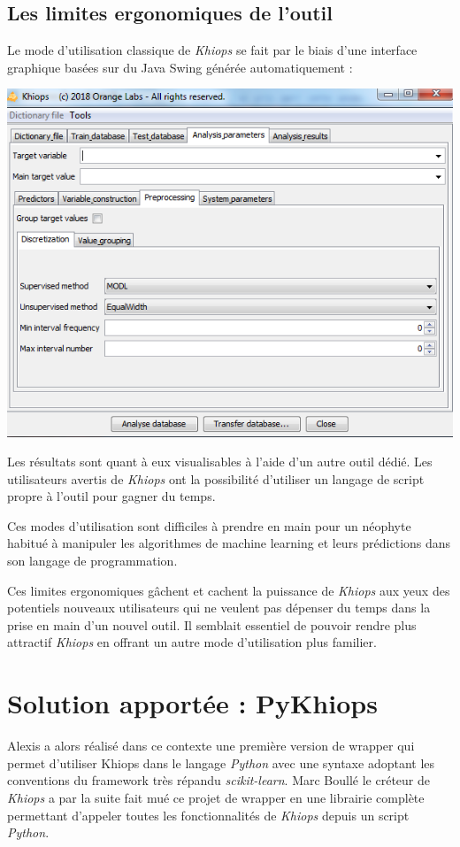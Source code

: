 \documentclass[12pt]{report}
\begin{document}
	\subsection{Les limites ergonomiques de l'outil}
	Le mode d'utilisation classique de \textit{Khiops} se fait par le biais d'une interface graphique basées sur du Java Swing générée automatiquement :
	\begin{center}
		\includegraphics[scale=0.8]{screen_ihm_khiops.png}\newline
	\end{center}
	Les résultats sont quant à eux visualisables à l'aide d'un autre outil dédié.
	Les utilisateurs avertis de \textit{Khiops} ont la possibilité d'utiliser un langage de script propre à l'outil pour gagner du temps.
	
	Ces modes d'utilisation sont difficiles à prendre en main pour un néophyte habitué à manipuler les algorithmes de machine learning et leurs prédictions dans son langage de programmation.
	
	Ces limites ergonomiques gâchent et cachent la puissance de \textit{Khiops} aux yeux des potentiels nouveaux utilisateurs qui ne veulent pas dépenser du temps dans la prise en main d'un nouvel outil. Il semblait essentiel de pouvoir rendre plus attractif \textit{Khiops} en offrant un autre mode d'utilisation plus familier.
	\section{Solution apportée : PyKhiops}
	Alexis a alors réalisé dans ce contexte une première version de wrapper qui permet d'utiliser Khiops dans le langage \textit{Python} avec une syntaxe adoptant les conventions du framework très répandu \textit{scikit-learn}.
	Marc Boullé le créteur de \textit{Khiops} a par la suite fait mué ce projet de wrapper en une librairie complète permettant d'appeler toutes les fonctionnalités de \textit{Khiops} depuis un script \textit{Python}.
	
\end{document}
